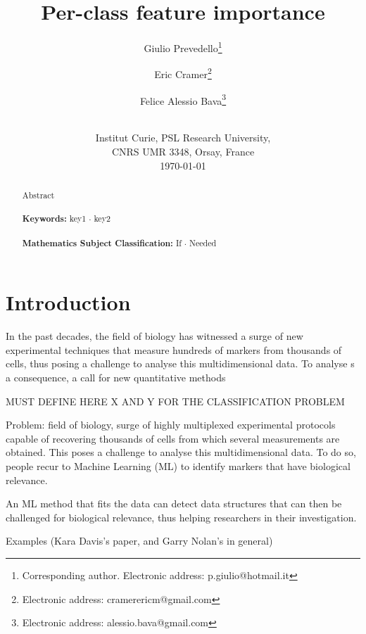\documentclass[12pt,a4paper]{article}
\theoremstyle{definition}
\theoremstyle{plain}
\theoremstyle{remark}
\begin{document}
\title{\textbf{Per-class feature importance}}

\author{Giulio Prevedello\footnote{
		Corresponding author. Electronic address: p.giulio@hotmail.it}
	\and
	Eric Cramer\footnote{
		Electronic address: cramerericm@gmail.com}
	\and
	Felice Alessio Bava\footnote{
		Electronic address: alessio.bava@gmail.com}\\ \\
}
\date{
	Institut Curie, PSL Research University,\\ CNRS UMR 3348, Orsay, France\\
	\medskip
	\today
}

\maketitle

\begin{abstract}
	Abstract\\
	\\
	\textbf{Keywords:} key1 $\cdot$ key2 \\
	\\
	\textbf{Mathematics Subject Classification:} If $\cdot$ Needed
	\end{abstract}

\section{Introduction}\label{sec:introduction}
In the past decades, the field of biology has witnessed a surge of new experimental techniques that measure hundreds of markers from thousands of cells, thus posing a challenge to analyse this multidimensional data. To analyse s a consequence, a call for new quantitative methods 

MUST DEFINE HERE X AND Y FOR THE CLASSIFICATION PROBLEM

Problem: field of biology, surge of highly multiplexed experimental protocols capable of recovering thousands of cells from which several measurements are obtained. This poses a challenge to analyse this multidimensional data. To do so, people recur to Machine Learning (ML) to identify markers that have biological relevance.

An ML method that fits the data can detect data structures that can then be challenged for biological relevance, thus helping researchers in their investigation.

Examples (Kara Davis's paper, and Garry Nolan's in general)
\end{document}
